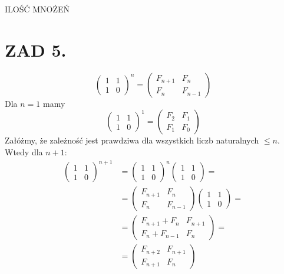 \documentclass{article}[13pt]
\begin{document}
{\color{acc}ILOŚĆ MNOŻEŃ}


    \section*{ZAD 5.}
    $$
    \begin{pmatrix}
        1 & 1\\
        1 & 0
    \end{pmatrix}^n=
    \begin{pmatrix}
        F_{n+1} & F_n\\
        F_n & F_{n-1}
    \end{pmatrix}
    $$
    Dla $n=1$ mamy
    $$\begin{pmatrix}
        1&1\\1&0
    \end{pmatrix}^1=\begin{pmatrix}
        F_2&F_1\\F_1&F_0
    \end{pmatrix}$$
    Załóżmy, że zależność jest prawdziwa dla wszystkich liczb naturalnych $\leq n$. Wtedy dla $n+1$:
    \begin{align*}
        \begin{pmatrix}
            1 & 1\\
            1 & 0
        \end{pmatrix}^{n+1}&=
        \begin{pmatrix}
            1 & 1\\
            1 & 0
        \end{pmatrix}^n
        \begin{pmatrix}
            1 & 1\\
            1 & 0
        \end{pmatrix}=\\
        &=\begin{pmatrix}
            F_{n+1} & F_n\\
            F_n & F_{n-1}
        \end{pmatrix}
        \begin{pmatrix}
            1 & 1\\
            1 & 0
        \end{pmatrix}=\\
        &=\begin{pmatrix}
            F_{n+1}+F_n & F_{n+1}\\
            F_n+F_{n-1} & F_n
        \end{pmatrix}=\\
        &=\begin{pmatrix}
            F_{n+2} & F_{n+1}\\
            F_{n+1} & F_n
        \end{pmatrix}
    \end{align*}
\end{document}
